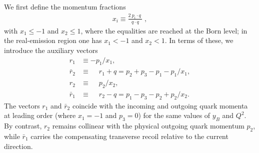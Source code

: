 \documentclass[a4paper,11pt]{article}
\newcommand{\ldot}[2]  {\:{#1}\!\cdot\!{#2}\:}
\begin{document}
We first define the momentum fractions
\begin{align}\label{eq:xi}
x_i \equiv \frac{ 2 \ldot{p_i}{q} } {\ldot{q}{q}}\;,
\end{align}
with $x_1 \leq -1$ and $x_2 \leq 1$, where the equalities are reached at the Born level; in the real-emission region one has $x_1<-1$ and $x_2<1$.
In terms of these, we introduce the auxiliary vectors
\begin{align}
  r_1       &\equiv          - p_1/x_1,\\
  \bar{r}_2 &\equiv \phantom{-}r_1+q=p_2+p_3-p_1-p_1/x_1,\\
  r_2       &\equiv \phantom{-}p_2/x_2,\\
  \bar{r}_1 &\equiv \phantom{-}r_2-q=p_1-p_3-p_2+p_2/x_2.
\end{align}
The vectors $r_1$ and $\bar{r}_2$ coincide with the incoming and outgoing quark momenta at leading order (where $x_1=-1$ and $p_3=0$) for the same values of $y_B$ and $Q^2$. By contrast, $r_2$ remains collinear with the physical outgoing quark momentum $p_2$, while $\bar{r}_1$ carries the compensating transverse recoil relative to the current direction.
\end{document}
